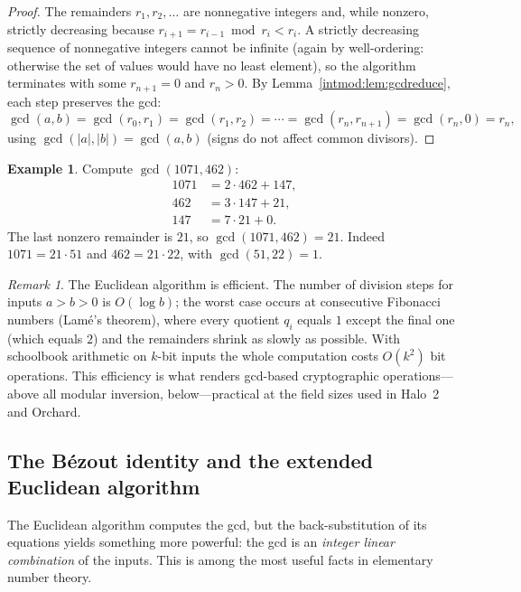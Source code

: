 \documentclass[11pt,a4paper]{article}
\theoremstyle{definition}
\newtheorem{example}[theorem]{Example}
\theoremstyle{remark}
\newtheorem{remark}[theorem]{Remark}
\begin{document}
\begin{proof}
The remainders \(r_1,r_2,\dots\) are nonnegative integers and, while nonzero, strictly decreasing because \(r_{i+1}=r_{i-1}\bmod r_i<r_i\). A strictly decreasing sequence of nonnegative integers cannot be infinite (again by well-ordering: otherwise the set of values would have no least element), so the algorithm terminates with some \(r_{n+1}=0\) and \(r_n>0\). By Lemma~\ref{intmod:lem:gcdreduce}, each step preserves the gcd:
\[
\gcd(a,b)=\gcd(r_0,r_1)=\gcd(r_1,r_2)=\cdots=\gcd(r_n,r_{n+1})=\gcd(r_n,0)=r_n,
\]
using \(\gcd(|a|,|b|)=\gcd(a,b)\) (signs do not affect common divisors).
\end{proof}

\begin{example}\label{intmod:exa:euclid}
Compute \(\gcd(1071,462)\):
\[
\begin{aligned}
1071 &= 2\cdot 462 + 147, \\
462 &= 3\cdot 147 + 21, \\
147 &= 7\cdot 21 + 0.
\end{aligned}
\]
The last nonzero remainder is \(21\), so \(\gcd(1071,462)=21\). Indeed \(1071=21\cdot 51\) and \(462=21\cdot 22\), with \(\gcd(51,22)=1\).
\end{example}

\begin{remark}\label{intmod:rem:euclidcomplexity}
The Euclidean algorithm is efficient. The number of division steps for inputs \(a>b>0\) is \(O(\log b)\); the worst case occurs at consecutive Fibonacci numbers (Lamé's theorem), where every quotient \(q_i\) equals \(1\) except the final one (which equals \(2\)) and the remainders shrink as slowly as possible. With schoolbook arithmetic on \(k\)-bit inputs the whole computation costs \(O(k^2)\) bit operations. This efficiency is what renders gcd-based cryptographic operations—above all modular inversion, below—practical at the field sizes used in Halo~2 and Orchard.
\end{remark}

\subsection{The Bézout identity and the extended Euclidean algorithm}\label{intmod:sub:bezout}

The Euclidean algorithm computes the gcd, but the back-substitution of its equations yields something more powerful: the gcd is an \emph{integer linear combination} of the inputs. This is among the most useful facts in elementary number theory.
\end{document}

